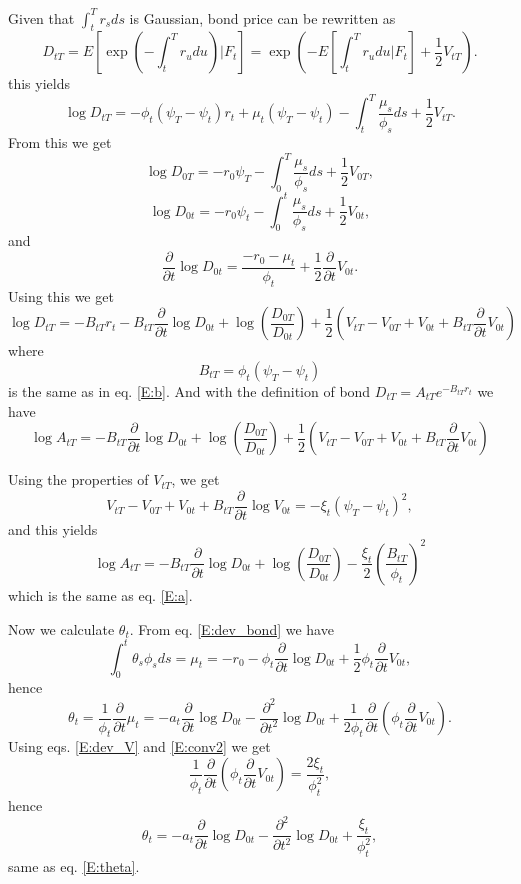 Given that $\int_t^T r_s ds$ is Gaussian, bond price can be rewritten as
\[
  D_{tT} = E \left[ \exp \left( -\int_t^T r_u du \right) | F_t \right]
         = \exp \left( -E[\int_t^T r_u du|F_t] + \frac{1}{2} V_{tT} \right).
\]
this yields
\[
  \log D_{tT} = - \phi_t(\psi_T-\psi_t) r_t + \mu_t(\psi_T-\psi_t)
                - \int_t^T \frac{\mu_s}{\phi_s} ds + \frac{1}{2} V_{tT}.
\]
From this we get
\[
  \log D_{0T} = - r_0 \psi_T - \int_0^T \frac{\mu_s}{\phi_s} ds 
                + \frac{1}{2} V_{0T},
\]
\[
  \log D_{0t} = - r_0 \psi_t - \int_0^t \frac{\mu_s}{\phi_s} ds 
                + \frac{1}{2} V_{0t},
\]
and 
\begin{equation} \label{E:dev_bond}
  \frac{\partial}{\partial t} \log D_{0t} 
    = \frac{-r_0-\mu_t}{\phi_t} 
      + \frac{1}{2} \frac{\partial}{\partial t} V_{0t}.
\end{equation}
Using this we get
\[
  \log D_{tT} = 
    - B_{tT} r_t - B_{tT} \frac{\partial}{\partial t} \log D_{0t} 
    + \log \left( \frac{D_{0T}}{D_{0t}} \right)
    + \frac{1}{2} 
        \left(
          V_{tT} - V_{0T} + V_{0t} 
          + B_{tT} \frac{\partial}{\partial t} V_{0t}
        \right)
\]
where 
\[
  B_{tT} = \phi_t(\psi_T-\psi_t)
\]
is the same as in eq. \ref{E:b}. And with the definition of bond
$D_{tT}=A_{tT} e^{-B_{tT} r_t}$ we have 
\[
  \log A_{tT} = 
    - B_{tT} \frac{\partial}{\partial t} \log D_{0t} 
    + \log \left( \frac{D_{0T}}{D_{0t}} \right)
    + \frac{1}{2} 
        \left(
          V_{tT} - V_{0T} + V_{0t} 
          + B_{tT} \frac{\partial}{\partial t} V_{0t}
        \right)
\]

Using the properties of $V_{tT}$, we get
\[
  V_{tT} - V_{0T} + V_{0t} 
  + B_{tT} \frac{\partial}{\partial t} \log V_{0t} 
  = - \xi_t(\psi_T-\psi_t)^2,
\]
and this yields
\[
  \log A_{tT} = 
    - B_{tT} \frac{\partial}{\partial t} \log D_{0t} 
    + \log \left( \frac{D_{0T}}{D_{0t}} \right)
    - \frac{\xi_t}{2} \left( \frac{B_{tT}}{\phi_t} \right)^2
\]
which is the same as eq. \ref{E:a}.

Now we calculate $\theta_t$. From eq. \ref{E:dev_bond} we have
\[
  \int_0^t \theta_s \phi_s ds = \mu_t 
    = -r_0 - \phi_t \frac{\partial}{\partial t} \log{D_{0t}}
      + \frac{1}{2} \phi_t \frac{\partial}{\partial t} V_{0t},
\]
hence
\[
  \theta_t = \frac{1}{\phi_t} \frac{\partial}{\partial t} \mu_t
    = - a_t \frac{\partial}{\partial t} \log{D_{0t}}
      - \frac{\partial^2}{\partial t^2} \log{D_{0t}}
      + \frac{1}{2 \phi_t} \frac{\partial}{\partial t} 
        \left(
          \phi_t \frac{\partial}{\partial t} V_{0t}
        \right).
\]
Using eqs. \ref{E:dev_V} and \ref{E:conv2} we get
\[
   \frac{1}{\phi_t} \frac{\partial}{\partial t} 
     \left( \phi_t \frac{\partial}{\partial t} V_{0t} \right)
   = \frac{2\xi_t}{\phi_t^2},
\]
hence
\[
  \theta_t 
    = - a_t \frac{\partial}{\partial t} \log{D_{0t}}
      - \frac{\partial^2}{\partial t^2} \log{D_{0t}}
      + \frac{\xi_t}{\phi_t^2},
\]
same as eq. \ref{E:theta}.

